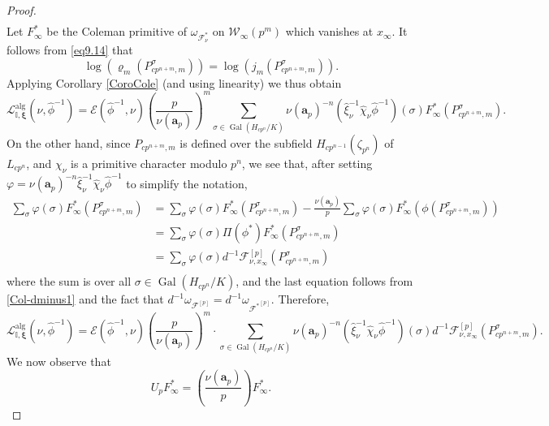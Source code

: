 \documentclass[10pt,a4paper]{amsart}
\DeclareMathOperator{\Gal}{Gal}
\newcommand{\I}{\mathbb{I}}
\begin{document}
\begin{proof}
{{\begin{equation}
\begin{split}
\end{split}\end{equation}}}
Let $F_\infty^*$ be the Coleman primitive of $\omega_{\mathcal{F}_\nu^*}$ on $\mathcal{W}_\infty(p^m)$ which vanishes at $x_\infty$. 
It follows from \eqref{eq9.14} that 
\[\log(\varrho_m( P_{cp^{n+m},m}^\sigma))=\log(j_m( P_{cp^{n+m},m}^\sigma)).\]
Applying Corollary \ref{CoroCole} (and using linearity) we thus obtain 
\[\mathscr{L}_{\I,\boldsymbol{\xi}}^{\mathrm{alg}}(\nu,\hat\phi^{-1})=\mathcal{E}(\hat\phi^{-1},\nu)\left(\frac{p}{\nu(\mathbf{a}_p)}\right)^m\sum_{\sigma\in\Gal(H_{cp^n}/K)}\nu(\mathbf{a}_p)^{-n}
(\hat\xi_\nu^{-1}\hat\chi_\nu\hat\phi^{-1})(\sigma)F_\infty^*({P}_{cp^{n+m},m}^\sigma).\]
On the other hand, since ${P}_{cp^{n+m},m}$ is defined over the subfield $H_{cp^{n-1}}(\zeta_{p^n})$ of $L_{cp^n}$, and $\chi_\nu$ is a primitive character modulo $p^n$,
we see that, after setting $\varphi=\nu(\mathbf{a}_p)^{-n}\hat\xi_\nu^{-1}\hat\chi_\nu\hat\phi^{-1}$ to simplify the notation,  
\begin{equation} \begin{split}
\sum_{\sigma}
\varphi(\sigma)F_\infty^*({P}_{cp^{n+m},m}^\sigma)&= 
\sum_{\sigma}
\varphi(\sigma)F_\infty^*({P}_{cp^{n+m},m}^\sigma)-\frac{\nu(\mathbf{a}_p)}{p}\sum_\sigma\varphi(\sigma)F^*_\infty(\phi({P}_{cp^{n+m},m}^\sigma))\\
&=\sum_{\sigma}
\varphi(\sigma)\Pi(\phi^*)F_\infty^*({P}_{cp^{n+m},m}^\sigma)\\
&=\sum_{\sigma}
\varphi (\sigma) d^{-1}{\mathcal{F}_{\nu , x_\infty}^{[p]}}({P}_{cp^{n+m},m}^\sigma)\\
\end{split}\end{equation}
where the sum is over all $\sigma\in\Gal(H_{cp^n}/K)$, and the last equation follows from \eqref{Col-dminus1} and the fact that $d^{-1}\omega_{\mathcal{F}^{[p]}}=d^{-1}\omega_{{\mathcal{F}^*}^{[p]}}$. Therefore, 
{\footnotesize{
\begin{equation}\label{13.5eq4}\mathscr{L}_{\I,\boldsymbol{\xi}}^{\mathrm{alg}}(\nu,\hat\phi^{-1})=\mathcal{E}(\hat\phi^{-1},\nu)\left(\frac{p}{\nu(\mathbf{a}_p)}\right)^m\cdot\sum_{\sigma\in\Gal(H_{cp^n}/K)}\nu(\mathbf{a}_p)^{-n}(\hat\xi_\nu^{-1}\hat\chi_\nu\hat\phi^{-1})(\sigma)d^{-1}{\mathcal{F}_{\nu, x_\infty}^{[p]}}({P}_{cp^{n+m},m}^\sigma).\end{equation} }}
We now observe that 
\begin{equation}\label{13.5eq3} U_pF_\infty^*=\left(\frac{\nu(\mathbf{a}_p)}{p}\right)F_\infty^*.\end{equation}

\end{proof}
\end{document}
